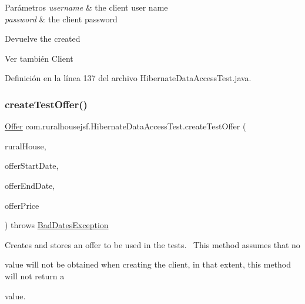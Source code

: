 \begin{DoxyParams}{Parámetros}
{\em username} & the client user name \\
\hline
{\em password} & the client password\\
\hline
\end{DoxyParams}
\begin{DoxyReturn}{Devuelve}
the created
\begin{DoxyCode}{0}
\end{DoxyCode}

\end{DoxyReturn}
\begin{DoxySeeAlso}{Ver también}
Client 
\end{DoxySeeAlso}


Definición en la línea 137 del archivo Hibernate\+Data\+Access\+Test.\+java.

\mbox{\label{classcom_1_1ruralhousejsf_1_1_hibernate_data_access_test_adb47ff6c8ba0fc7e7327407a8c937c4a}} 
\subsubsection{\texorpdfstring{createTestOffer()}{createTestOffer()}}
{\footnotesize\ttfamily \mbox{\hyperlink{classcom_1_1ruralhousejsf_1_1domain_1_1_offer}{Offer}} com.\+ruralhousejsf.\+Hibernate\+Data\+Access\+Test.\+create\+Test\+Offer (\begin{DoxyParamCaption}\item[{\mbox{\hyperlink{classcom_1_1ruralhousejsf_1_1domain_1_1_rural_house}{Rural\+House}}}]{rural\+House,  }\item[{Local\+Date}]{offer\+Start\+Date,  }\item[{Local\+Date}]{offer\+End\+Date,  }\item[{double}]{offer\+Price }\end{DoxyParamCaption}) throws \mbox{\hyperlink{classcom_1_1ruralhousejsf_1_1exceptions_1_1_bad_dates_exception}{Bad\+Dates\+Exception}}\hspace{0.3cm}{\ttfamily [private]}}

Creates and stores an offer to be used in the tests.~\newline
 This method assumes that no
\begin{DoxyCode}{0}
\DoxyCodeLine{\textcolor{keyword}{null} }
\end{DoxyCode}
 value will not be obtained when creating the client, in that extent, this method will not return a 
\begin{DoxyCode}{0}
\DoxyCodeLine{\textcolor{keyword}{null} }
\end{DoxyCode}
 value. 

